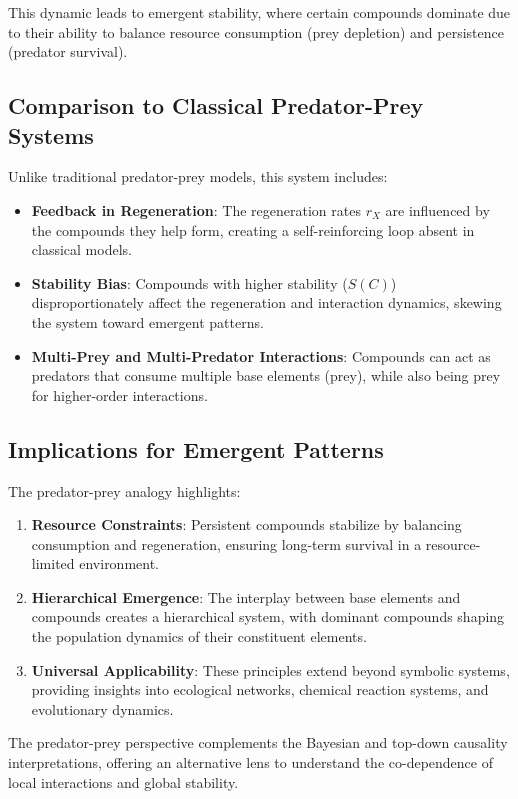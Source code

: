 \documentclass[entropy,article,submit,pdftex,moreauthors]{Definitions/mdpi}
\begin{document}
This dynamic leads to emergent stability, where certain compounds dominate due to their ability to balance resource consumption (prey depletion) and persistence (predator survival).

\subsection{Comparison to Classical Predator-Prey Systems}

Unlike traditional predator-prey models, this system includes:
\begin{itemize}
    \item \textbf{Feedback in Regeneration}: The regeneration rates \( r_X \) are influenced by the compounds they help form, creating a self-reinforcing loop absent in classical models.
    \item \textbf{Stability Bias}: Compounds with higher stability (\( S(C) \)) disproportionately affect the regeneration and interaction dynamics, skewing the system toward emergent patterns.
    \item \textbf{Multi-Prey and Multi-Predator Interactions}: Compounds can act as predators that consume multiple base elements (prey), while also being prey for higher-order interactions.
\end{itemize}

\subsection{Implications for Emergent Patterns}

The predator-prey analogy highlights:
\begin{enumerate}
    \item \textbf{Resource Constraints}: Persistent compounds stabilize by balancing consumption and regeneration, ensuring long-term survival in a resource-limited environment.
    \item \textbf{Hierarchical Emergence}: The interplay between base elements and compounds creates a hierarchical system, with dominant compounds shaping the population dynamics of their constituent elements.
    \item \textbf{Universal Applicability}: These principles extend beyond symbolic systems, providing insights into ecological networks, chemical reaction systems, and evolutionary dynamics.
\end{enumerate}

The predator-prey perspective complements the Bayesian and top-down causality interpretations, offering an alternative lens to understand the co-dependence of local interactions and global stability.
\end{document}
